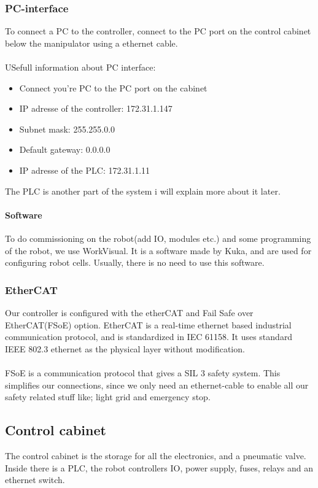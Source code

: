 \documentclass{article}
\begin{document}
        \subsubsection{PC-interface}
       To connect a PC to the controller, connect to the PC port on the control cabinet below the manipulator using a ethernet cable. 
        \\\\
        USefull information about PC interface:
        \begin{itemize}
            \item Connect you're PC to the PC port on the cabinet
            \item IP adresse of the controller: 172.31.1.147
            \item Subnet mask:                  255.255.0.0
            \item Default gateway:              0.0.0.0
            \item IP adresse of the PLC: 172.31.1.11 
        \end{itemize}
        The PLC is another part of the system i will explain more about it later. 
        \paragraph{Software}
         To do commissioning on the robot(add IO, modules etc.) and some programming of the robot, we use WorkVisual. It is a software made by Kuka, and are used for configuring robot cells. Usually, there is no need to use this software.
         
        \subsubsection{EtherCAT}
        Our controller is configured with the etherCAT and Fail Safe over EtherCAT(FSoE) option. EtherCAT is a real-time ethernet based industrial communication protocol, and is standardized in IEC 61158. It uses standard IEEE 802.3 ethernet as the physical layer without modification. 
        \\\\
        FSoE is a communication protocol that gives a SIL 3 safety system. This simplifies our connections, since we only need an ethernet-cable to enable all our safety related stuff like; light grid and emergency stop. 
        
        
\newpage

    \subsection{Control cabinet}
    The control cabinet is the storage for all the electronics, and a pneumatic valve. Inside there is a PLC, the robot controllers IO, power supply, fuses, relays and an ethernet switch.
\end{document}
